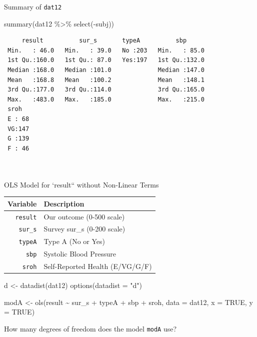 \documentclass[
  ignorenonframetext,
]{beamer}
\newenvironment{Shaded}{\begin{snugshade}}{\end{snugshade}}
\newcommand{\AttributeTok}[1]{\textcolor[rgb]{0.77,0.63,0.00}{#1}}
\newcommand{\ConstantTok}[1]{\textcolor[rgb]{0.00,0.00,0.00}{#1}}
\newcommand{\FunctionTok}[1]{\textcolor[rgb]{0.00,0.00,0.00}{#1}}
\newcommand{\NormalTok}[1]{#1}
\newcommand{\OtherTok}[1]{\textcolor[rgb]{0.56,0.35,0.01}{#1}}
\newcommand{\SpecialCharTok}[1]{\textcolor[rgb]{0.00,0.00,0.00}{#1}}
\newcommand{\StringTok}[1]{\textcolor[rgb]{0.31,0.60,0.02}{#1}}
\begin{document}
\begin{frame}[fragile]{Summary of \texttt{dat12}}
\protect\hypertarget{summary-of-dat12}{}
\begin{Shaded}
\begin{Highlighting}[]
\FunctionTok{summary}\NormalTok{(dat12 }\SpecialCharTok{\%\textgreater{}\%} \FunctionTok{select}\NormalTok{(}\SpecialCharTok{{-}}\NormalTok{subj))}
\end{Highlighting}
\end{Shaded}

\begin{verbatim}
     result          sur_s       typeA          sbp       
 Min.   : 46.0   Min.   : 39.0   No :203   Min.   : 85.0  
 1st Qu.:160.0   1st Qu.: 87.0   Yes:197   1st Qu.:132.0  
 Median :168.0   Median :101.0             Median :147.0  
 Mean   :168.8   Mean   :100.2             Mean   :148.1  
 3rd Qu.:177.0   3rd Qu.:114.0             3rd Qu.:165.0  
 Max.   :483.0   Max.   :185.0             Max.   :215.0  
 sroh    
 E : 68  
 VG:147  
 G :139  
 F : 46  
         
         
\end{verbatim}
\end{frame}

\begin{frame}[fragile]{OLS Model for `result`` without Non-Linear Terms}
\protect\hypertarget{ols-model-for-result-without-non-linear-terms}{}
\begin{longtable}[]{@{}rl@{}}
\toprule
Variable & Description \\
\midrule
\endhead
\texttt{result} & Our outcome (0-500 scale) \\
\texttt{sur\_s} & Survey sur\_s (0-200 scale) \\
\texttt{typeA} & Type A (No or Yes) \\
\texttt{sbp} & Systolic Blood Pressure \\
\texttt{sroh} & Self-Reported Health (E/VG/G/F) \\
\bottomrule
\end{longtable}

\begin{Shaded}
\begin{Highlighting}[]
\NormalTok{d }\OtherTok{\textless{}{-}} \FunctionTok{datadist}\NormalTok{(dat12)}
\FunctionTok{options}\NormalTok{(}\AttributeTok{datadist =} \StringTok{"d"}\NormalTok{)}

\NormalTok{modA }\OtherTok{\textless{}{-}} \FunctionTok{ols}\NormalTok{(result }\SpecialCharTok{\textasciitilde{}}\NormalTok{ sur\_s }\SpecialCharTok{+}\NormalTok{ typeA }\SpecialCharTok{+}\NormalTok{ sbp }\SpecialCharTok{+}\NormalTok{ sroh, }
               \AttributeTok{data =}\NormalTok{ dat12, }\AttributeTok{x =} \ConstantTok{TRUE}\NormalTok{, }\AttributeTok{y =} \ConstantTok{TRUE}\NormalTok{)}
\end{Highlighting}
\end{Shaded}

How many degrees of freedom does the model \texttt{modA} use?
\end{frame}
\end{document}
